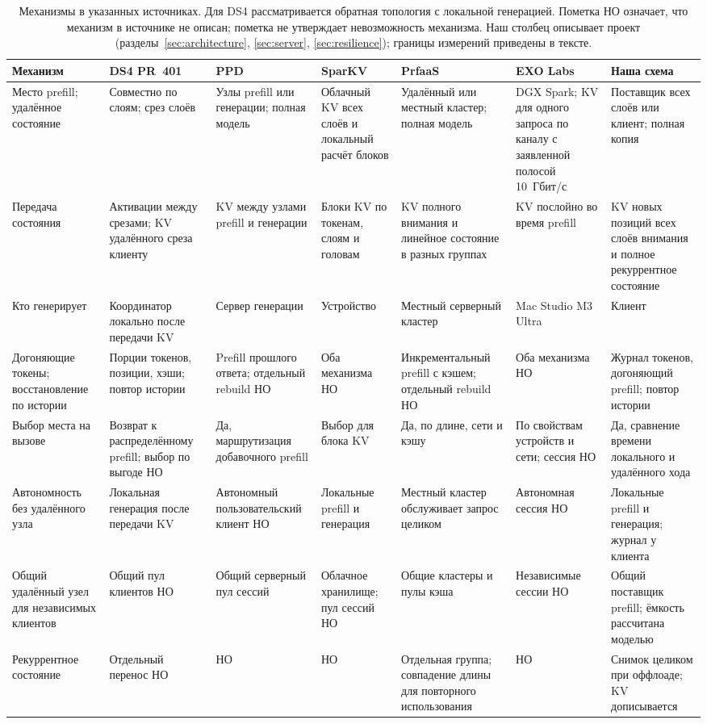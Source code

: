 \begin{table}[t]
\centering
\caption{Механизмы в указанных источниках. Для DS4 рассматривается обратная топология с локальной генерацией.
Пометка НО означает, что механизм в источнике не описан; пометка не утверждает невозможность механизма.
Наш столбец описывает проект (разделы~\ref{sec:architecture}, \ref{sec:server}, \ref{sec:resilience});
границы измерений приведены в тексте.}
\label{tab:mechanisms}
\scriptsize
\setlength{\tabcolsep}{0.7mm}
\begin{tabular}{L{25mm}L{21.5mm}L{21.5mm}L{21.5mm}L{22mm}L{21.5mm}L{21.5mm}}
\toprule
Механизм & DS4 PR~401 \cite{ds4pr401,ds4code401} & PPD \cite{li2026ppd} & SparKV \cite{liu2026sparkv} & PrfaaS \cite{qin2026prfaas} & EXO Labs \cite{exolabsSpark} & Наша схема \\
\midrule
Место prefill; удалённое состояние & Совместно по слоям; срез слоёв & Узлы prefill или генерации; полная модель & Облачный KV всех слоёв и локальный расчёт блоков & Удалённый или местный кластер; полная модель & DGX Spark; KV для одного запроса по каналу с заявленной полосой 10~Гбит/с & Поставщик всех слоёв или клиент; полная копия \\
Передача состояния & Активации между срезами; KV удалённого среза клиенту & KV между узлами prefill и генерации & Блоки KV по токенам, слоям и головам & KV полного внимания и линейное состояние в разных группах & KV послойно во время prefill & KV новых позиций всех слоёв внимания и полное рекуррентное состояние \\
Кто генерирует & Координатор локально после передачи KV & Сервер генерации & Устройство & Местный серверный кластер & Mac Studio M3 Ultra & Клиент \\
Догоняющие токены; восстановление по истории & Порции токенов, позиции, хэши; повтор истории & Prefill прошлого ответа; отдельный rebuild НО & Оба механизма НО & Инкрементальный prefill с кэшем; отдельный rebuild НО & Оба механизма НО & Журнал токенов, догоняющий prefill; повтор истории \\
Выбор места на вызове & Возврат к распределённому prefill; выбор по выгоде НО & Да, маршрутизация добавочного prefill & Выбор для блока KV & Да, по длине, сети и кэшу & По свойствам устройств и сети; сессия НО & Да, сравнение времени локального и удалённого хода \\
Автономность без удалённого узла & Локальная генерация после передачи KV & Автономный пользовательский клиент НО & Локальные prefill и генерация & Местный кластер обслуживает запрос целиком & Автономная сессия НО & Локальные prefill и генерация; журнал у клиента \\
Общий удалённый узел для независимых клиентов & Общий пул клиентов НО & Общий серверный пул сессий & Облачное хранилище; пул сессий НО & Общие кластеры и пулы кэша & Независимые сессии НО & Общий поставщик prefill; ёмкость рассчитана моделью \\
Рекуррентное состояние & Отдельный перенос НО & НО & НО & Отдельная группа; совпадение длины для повторного использования & НО & Снимок целиком при оффлоаде; KV дописывается \\
\bottomrule
\end{tabular}
\end{table}

